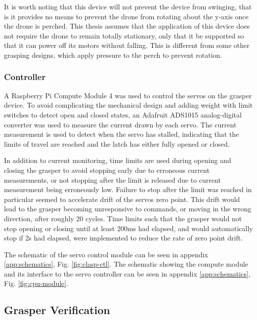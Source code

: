It is worth noting that this device will not prevent the device from swinging, that is it provides no means 
to prevent the drone from rotating about the y-axis once the drone is perched. This thesis assumes that the 
application of this device does not require the drone to remain totally stationary, only that it be supported 
so that it can power off its motors without falling. This is different from some other grasping designs, which 
apply pressure to the perch to prevent rotation.

\subsubsection{Controller} \label{sec:methods:controller}

A Raspberry Pi Compute Module 4 was used to control the servos on the grasper device. To avoid 
complicating the mechanical design and adding weight with limit switches to detect open and closed states, 
an Adafruit ADS1015 analog-digital converter was used to measure the current drawn by each servo.
The current measurement is used to detect when the servo has stalled, indicating 
that the limits of travel are reached and the latch has either fully opened or closed.

In addition to current monitoring, time limits are used during opening and closing the grasper to avoid stopping early 
due to erroneous current measurements, or not stopping after the limit is released due to current measurement
being erroneously low. Failure to stop after the limit was reached in particular seemed to accelerate drift of 
the servos zero point. This drift would lead to the grasper becoming unresponsive to commands, or moving in the
wrong direction, after roughly 20 cycles. Time limits such that the grasper would not stop opening or closing
until at least 200ms had elapsed, and would automatically stop if 2s had elapsed, were implemented to reduce 
the rate of zero point drift.

The schematic of the servo control module can be seen in appendix \ref{app:schematics},
Fig. \ref{fig:clasp-ctl}. The schematic showing the compute module and its interface to the
servo controller can be seen in appendix \ref{app:schematics},
Fig. \ref{fig:cpu-module}.


\subsection{Grasper Verification}

